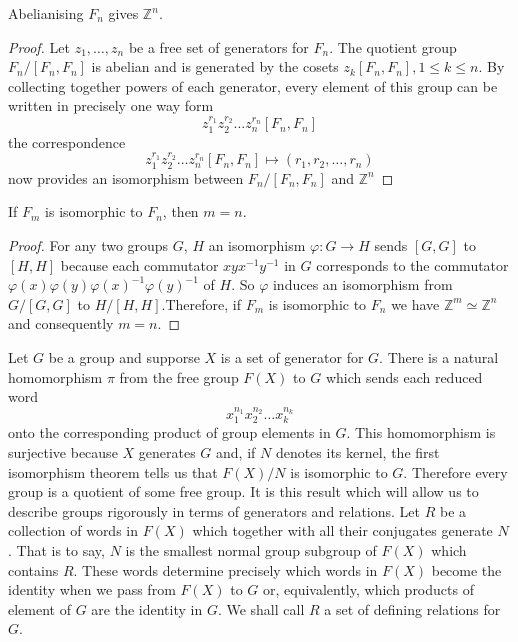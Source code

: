 \begin{theoreme}
    Abelianising $F_n$ gives $\mathbb{Z}^n$.
\end{theoreme}

\begin{proof}
    Let $z_1,\dotsc,z_n$ be a free set of generators for $F_n$. The quotient group
    $F_n/[F_n,F_n]$ is abelian and is generated by the cosets $z_k[F_n,F_n], 1\leq k\leq n$. By collecting together powers of each generator, every element of this group can be written in precisely one way form
    \begin{equation*}
        z_1^{r_1}z_2^{r_2}\dotsc z_n^{r_n}[F_n,F_n]
    \end{equation*}
    the correspondence
    \begin{equation*}
        z_1^{r_1}z_2^{r_2}\dotsc z_n^{r_n}[F_n,F_n]\mapsto (r_1,r_2,\dotsc,r_n)
    \end{equation*}
    now provides an isomorphism between $F_n/[F_n,F_n]$ and $\mathbb{Z}^n$
\end{proof}

\begin{theoreme}
    If $F_m$ is isomorphic to $F_n$, then $m=n$.
\end{theoreme}

\begin{proof}
    For any two groups $G$, $H$ an isomorphism $\varphi:G\to H$ sends $[G,G]$ to $[H,H]$ because each commutator $xyx^{-1}y^{-1}$ in $G$ corresponds to the commutator $\varphi(x)\varphi(y)\varphi(x)^{-1}\varphi(y)^{-1}$ of $H$. So $\varphi$ induces an isomorphism from $G/[G,G]$ to $H/[H,H]$.Therefore, if $F_m$ is isomorphic to $F_n$ we have $\mathbb{Z}^m\simeq\mathbb{Z}^n$ and consequently $m=n$.
\end{proof}
Let $G$ be a group and supporse $X$ is a set of generator for $G$. There is a natural homomorphism $\pi$ from the free group $F(X)$ to $G$ which sends each reduced word
\begin{equation*}
    x_1^{n_1}x_2^{n_2}\dotsc x_k^{n_k}
\end{equation*}
onto the corresponding product of group elements in $G$. This homomorphism is surjective because $X$ generates $G$ and, if $N$ denotes its kernel, the first isomorphism theorem tells us that $F(X)/N$ is isomorphic to $G$. Therefore every group is a quotient of some free group. It is this result which will allow us to describe groups rigorously in terms of generators and relations. Let $R$ be a collection of words in $F(X)$ which together with all their conjugates generate $N$. That is to say, $N$ is the smallest normal group subgroup of $F(X)$ which contains $R$. These words determine precisely which words  in $F(X)$ become the identity when we pass from $F(X)$ to $G$ or, equivalently, which products of element of $G$ are the identity in $G$. We shall call $R$ a set of defining relations for $G$.

